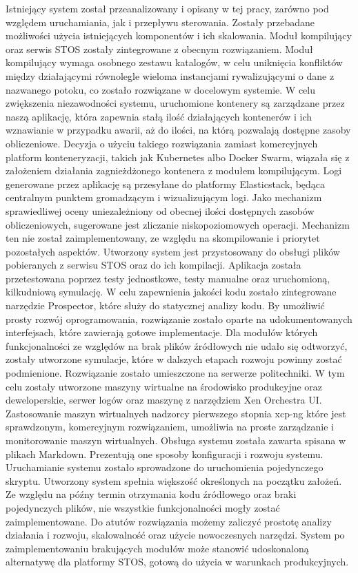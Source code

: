 Istniejący system został przeanalizowany i opisany w tej pracy, zarówno pod względem uruchamiania, jak i przepływu sterowania. Zostały przebadane możliwości użycia istniejących komponentów i ich skalowania. Moduł kompilujący oraz serwis STOS zostały zintegrowane z obecnym rozwiązaniem. Moduł kompilujący wymaga osobnego zestawu katalogów, w celu uniknięcia konfliktów między działającymi równolegle wieloma instancjami rywalizującymi o dane z nazwanego potoku, co zostało rozwiązane w docelowym systemie.
\newline \indent W celu zwiększenia niezawodności systemu, uruchomione kontenery są zarządzane przez naszą aplikację, która zapewnia stałą ilość działających kontenerów i ich wznawianie w przypadku awarii, aż do ilości, na którą pozwalają dostępne zasoby obliczeniowe. Decyzja o użyciu takiego rozwiązania zamiast komercyjnych platform konteneryzacji, takich jak Kubernetes albo Docker Swarm, wiązała się z założeniem działania zagnieżdżonego kontenera z modułem kompilującym. Logi generowane przez aplikację są przesyłane do platformy Elasticstack, będąca centralnym punktem gromadzącym i wizualizującym logi. Jako mechanizm sprawiedliwej oceny uniezależniony od obecnej ilości dostępnych zasobów obliczeniowych, sugerowane jest zliczanie niskopoziomowych operacji. Mechanizm ten nie został zaimplementowany, ze względu na skompilowanie i priorytet pozostałych aspektów.
\newline \indent Utworzony system jest przystosowany do obsługi plików pobieranych z serwisu STOS oraz do ich kompilacji. Aplikacja została przetestowana poprzez testy jednostkowe, testy manualne oraz uruchomioną, kilkudniową symulację. W celu zapewnienia jakości kodu zostało zintegrowane narzędzie Prospector, które służy do statycznej analizy kodu. By umożliwić prosty rozwój oprogramowania, rozwiązanie zostało oparte na udokumentowanych interfejsach, które zawierają gotowe implementacje. Dla modułów których funkcjonalności ze względów na brak plików źródłowych nie udało się odtworzyć, zostały utworzone symulacje, które w dalszych etapach rozwoju powinny zostać podmienione.
\newline \indent Rozwiązanie zostało umieszczone na serwerze politechniki. W tym celu zostały utworzone maszyny wirtualne na środowisko produkcyjne oraz deweloperskie, serwer logów oraz maszynę z narzędziem Xen Orchestra UI. Zastosowanie maszyn wirtualnych nadzorcy pierwszego stopnia xcp-ng które jest sprawdzonym, komercyjnym rozwiązaniem, umożliwia na proste zarządzanie i monitorowanie maszyn wirtualnych.
\newline \indent Obsługa systemu została zawarta spisana w plikach Markdown. Prezentują one sposoby konfiguracji i rozwoju systemu. Uruchamianie systemu zostało sprowadzone do uruchomienia pojedynczego skryptu.
\newline \indent Utworzony system spełnia większość określonych na początku założeń. Ze względu na późny termin otrzymania kodu źródłowego oraz braki pojedynczych plików, nie wszystkie funkcjonalności mogły zostać zaimplementowane. Do atutów rozwiązania możemy zaliczyć prostotę analizy działania i rozwoju, skalowalność oraz użycie nowoczesnych narzędzi. System po zaimplementowaniu brakujących modułów może stanowić udoskonaloną alternatywę dla platformy STOS, gotową do użycia w warunkach produkcyjnych.